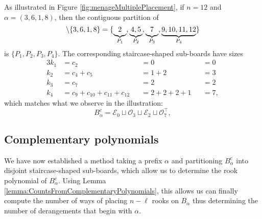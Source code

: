 \begin{example}
  As illustrated in Figure \ref{fig:menageMultiplePlacement}, if $n = 12$
  and $\alpha = (3,6,1,8)$, then the contiguous partition of \begin{equation}
    [12] \setminus \{3,6,1,8\} = \{
      \underbrace{2\vphantom{,}}_{P_1},
      \underbrace{4, 5}_{P_2},
      \underbrace{7\vphantom{,}}_{P_3},
      \underbrace{9, 10, 11, 12}_{P_4}
    \}
  \end{equation} is $\{P_1, P_2, P_3, P_4\}$. The corresponding staircase-shaped sub-boards
  have sizes
  \begin{alignat*}{3}
    k_1 &= c_2                            &&= 0             &&= 0 \\
    k_2 &= c_4 + c_5                      &&= 1 + 2         &&= 3 \\
    k_3 &= c_7                            &&= 2             &&= 2 \\
    k_4 &= c_9 + c_{10} + c_{11} + c_{12} &&= 2 + 2 + 2 + 1 &&= 7,
  \end{alignat*}
  which matches what we observe in the illustration:
  \begin{equation}
    B_\alpha^c = \mathcal{E}_0 \sqcup \mathcal{O}_3 \sqcup \mathcal{E}_2 \sqcup \mathcal{O}_7^\intercal,
  \end{equation}
  \label{ex:blocksFromPrefix}
\end{example}

\subsection{Complementary polynomials}
We have now established a method taking a prefix $\alpha$
and partitioning $B_\alpha^c$ into disjoint staircase-shaped sub-boards,
which allow us to determine the rook polynomial of $B_\alpha^c$.
Using Lemma \ref{lemma:CountsFromComplementaryPolynomials}, this allows us
can finally compute the number of ways of placing $n - \ell$ rooks on
$B_\alpha$ thus determining the number of derangements that begin with
$\alpha$.

